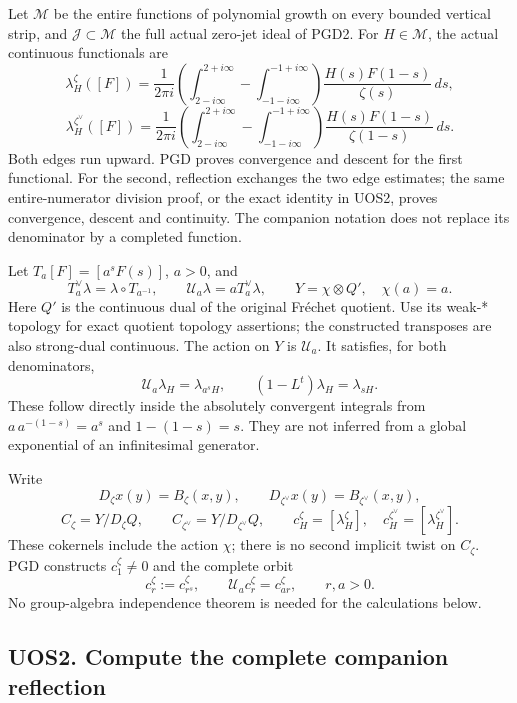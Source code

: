 Let \(\mathcal M\) be the entire functions of polynomial growth on every
bounded vertical strip, and \(\mathcal J\subset\mathcal M\) the full
actual zero-jet ideal of PGD2. For \(H\in\mathcal M\), the actual
continuous functionals are \[
 \lambda_H^\zeta([F])=
 \frac1{2\pi i}\left(
 \int_{2-i\infty}^{2+i\infty}
 -\int_{-1-i\infty}^{-1+i\infty}\right)
 \frac{H(s)F(1-s)}{\zeta(s)}\,ds ,
\] \[
 \lambda_H^{\zeta^\vee}([F])=
 \frac1{2\pi i}\left(
 \int_{2-i\infty}^{2+i\infty}
 -\int_{-1-i\infty}^{-1+i\infty}\right)
 \frac{H(s)F(1-s)}{\zeta(1-s)}\,ds .
 \tag{UOS1.3}
\] Both edges run upward. PGD proves convergence and descent for the
first functional. For the second, reflection exchanges the two edge
estimates; the same entire-numerator division proof, or the exact
identity in UOS2, proves convergence, descent and continuity. The
companion notation does not replace its denominator by a completed
function.

Let \(T_a[F]=[a^sF(s)]\), \(a>0\), and \[
 T_a^\vee\lambda=\lambda\circ T_{a^{-1}},\qquad
 \mathcal U_a\lambda=aT_a^\vee\lambda,\qquad
 Y=\chi\otimes Q',\quad\chi(a)=a .
\] Here \(Q'\) is the continuous dual of the original Fréchet quotient.
Use its weak-* topology for exact quotient topology assertions; the
constructed transposes are also strong-dual continuous. The action on
\(Y\) is \(\mathcal U_a\). It satisfies, for both denominators, \[
 \mathcal U_a\lambda_H=\lambda_{a^sH},\qquad
 (1-L^t)\lambda_H=\lambda_{sH}.
 \tag{UOS1.4}
\] These follow directly inside the absolutely convergent integrals from
\(a\,a^{-(1-s)}=a^s\) and \(1-(1-s)=s\). They are not inferred from a
global exponential of an infinitesimal generator.

Write \[
 D_\zeta x(y)=B_\zeta(x,y),\qquad
 D_{\zeta^\vee}x(y)=B_{\zeta^\vee}(x,y),
\] \[
 C_\zeta=Y/D_\zeta Q,\qquad
 C_{\zeta^\vee}=Y/D_{\zeta^\vee}Q,\qquad
 c_H^\zeta=[\lambda_H^\zeta],\quad
 c_H^{\zeta^\vee}=[\lambda_H^{\zeta^\vee}].
 \tag{UOS1.5}
\] These cokernels include the action \(\chi\); there is no second
implicit twist on \(C_\zeta\). PGD constructs \(c_1^\zeta\ne0\) and the
complete orbit \[
 c_r^\zeta:=c_{r^s}^\zeta,\qquad
 \mathcal U_a c_r^\zeta=c_{ar}^\zeta,\qquad r,a>0.
 \tag{UOS1.6}
\] No group-algebra independence theorem is needed for the calculations
below.

\subsection{UOS2. Compute the complete companion
reflection}\label{uos2.-compute-the-complete-companion-reflection}

